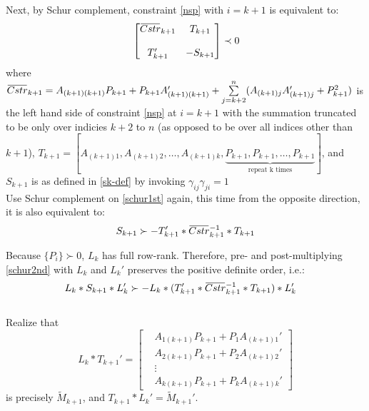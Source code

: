 \documentclass{article}
\newcommand{\overbar}[1]{\mkern 1.5mu\overline{\mkern-1.5mu#1\mkern-1.5mu}\mkern 1.5mu}
\begin{document}
Next, by Schur complement, constraint \eqref{nsp} with $i=k+1$ is equivalent to:
\begin{equation}\label{schur1st}
\begin{aligned}
&\begin{bmatrix}
\overbar{Cstr}_{k+1}& T_{k+1}\\
   \\
T_{k+1}' &-S_{k+1}\\
\end{bmatrix}
\prec 0\\
\end{aligned}
\end{equation}where $\overbar{Cstr}_{k+1}=A_{(k+1)(k+1)}P_{k+1}+P_{k+1}A_{(k+1)(k+1)}'+\sum\limits_{j=k+2}^{n}(A_{(k+1)j}A_{(k+1)j}'+P_{k+1}^2)$ is the left hand side of constraint \eqref{nsp} at $i=k+1$ with the summation truncated to be only over indicies $k+2$ to $n$ (as opposed to be over all indices other than $k+1$), $T_{k+1}=[A_{(k+1)1},A_{(k+1)2},\dots, A_{(k+1)k}, \underbrace{P_{k+1},P_{k+1},\dots,P_{k+1}}_{\text{repeat k times}}]$, and $S_{k+1}$ is as defined in \eqref{sk-def} by invoking $\gamma_{ij}{\gamma_{ji}}=1$\\

Use Schur complement on \eqref{schur1st} again, this time from the opposite direction, it is also equivalent to:
\begin{equation}\label{schur2nd}
S_{k+1}\succ -T_{k+1}'*\overbar{Cstr}_{k+1}^{-1}*T_{k+1}
\end{equation}

Because $\{P_i\}\succ 0$, $L_k$ has full row-rank. Therefore, pre- and post-multiplying \eqref{schur2nd} with $L_k$ and $L_k'$ preserves the positive definite order, i.e.:
\begin{equation}\label{leftrightpreserve}
\begin{aligned}
&L_{k}*S_{k+1}*L_{k}'\succ - L_{k}*(T_{k+1}'*\overbar{Cstr}_{k+1}^{-1}*T_{k+1})*L_{k}'
\end{aligned}
\end{equation}\\
Realize that 
\[L_{k}*T_{k+1}'=\begin{bmatrix}
&A_{1(k+1)}P_{k+1}+P_{1}A_{(k+1)1}'\\
&A_{2(k+1)}P_{k+1}+P_{2}A_{(k+1)2}'\\
&\vdots  \\
&A_{k(k+1)}P_{k+1}+P_{k}A_{(k+1)k}'
\end{bmatrix}\] is precisely $\tilde M_{k+1}$, and $T_{k+1}*L_{k}'=\tilde M_{k+1}'$.\\
\end{document}

